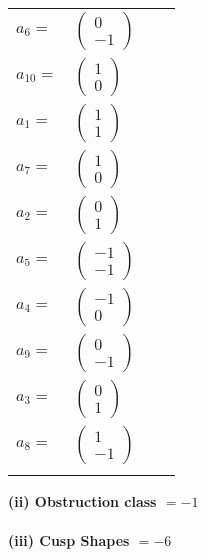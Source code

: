 \documentclass[1p]{elsarticle_modified}
\theoremstyle{definition}
\begin{document}
\begin{tabular}{m{7pt} m{180pt} m{7pt} m{180pt} }
\flushright $a_{6}=$&$\begin{pmatrix}0\\-1\end{pmatrix}$ \\
\flushright $a_{10}=$&$\begin{pmatrix}1\\0\end{pmatrix}$ \\
\flushright $a_{1}=$&$\begin{pmatrix}1\\1\end{pmatrix}$ \\
\flushright $a_{7}=$&$\begin{pmatrix}1\\0\end{pmatrix}$ \\
\flushright $a_{2}=$&$\begin{pmatrix}0\\1\end{pmatrix}$ \\
\flushright $a_{5}=$&$\begin{pmatrix}-1\\-1\end{pmatrix}$ \\
\flushright $a_{4}=$&$\begin{pmatrix}-1\\0\end{pmatrix}$ \\
\flushright $a_{9}=$&$\begin{pmatrix}0\\-1\end{pmatrix}$ \\
\flushright $a_{3}=$&$\begin{pmatrix}0\\1\end{pmatrix}$ \\
\flushright $a_{8}=$&$\begin{pmatrix}1\\-1\end{pmatrix}$\\&\end{tabular}
\flushleft \textbf{(ii) Obstruction class $= -1$}\\~\\
\flushleft \textbf{(iii) Cusp Shapes $= -6$}\\~\\
\end{document}
